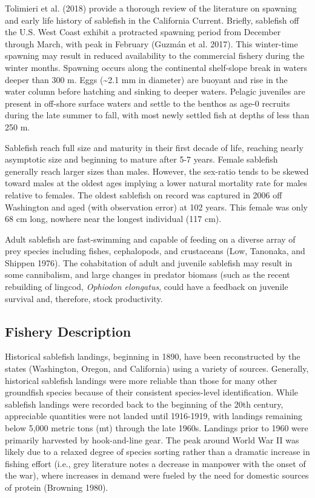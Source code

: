 \documentclass[
]{scrartcl}
\begin{document}
Tolimieri et al. (2018) provide a thorough review of the literature on
spawning and early life history of sablefish in the California Current.
Briefly, sablefish off the U.S. West Coast exhibit a protracted spawning
period from December through March, with peak in February (Guzmán et al.
2017). This winter-time spawning may result in reduced availability to
the commercial fishery during the winter months. Spawning occurs along
the continental shelf-slope break in waters deeper than 300 m. Eggs
(\textasciitilde2.1 mm in diameter) are buoyant and rise in the water
column before hatching and sinking to deeper waters. Pelagic juveniles
are present in off-shore surface waters and settle to the benthos as
age-0 recruits during the late summer to fall, with most newly settled
fish at depths of less than 250 m.

Sablefish reach full size and maturity in their first decade of life,
reaching nearly asymptotic size and beginning to mature after 5-7 years.
Female sablefish generally reach larger sizes than males. However, the
sex-ratio tends to be skewed toward males at the oldest ages implying a
lower natural mortality rate for males relative to females. The oldest
sablefish on record was captured in 2006 off Washington and aged (with
observation error) at 102 years. This female was only 68 cm long,
nowhere near the longest individual (117 cm).

Adult sablefish are fast-swimming and capable of feeding on a diverse
array of prey species including fishes, cephalopods, and crustaceans
(Low, Tanonaka, and Shippen 1976). The cohabitation of adult and
juvenile sablefish may result in some cannibalism, and large changes in
predator biomass (such as the recent rebuilding of lingcod,
\emph{Ophiodon elongatus}, could have a feedback on juvenile survival
and, therefore, stock productivity.

\subsection{Fishery Description}\label{fishery-description}

Historical sablefish landings, beginning in 1890, have been
reconstructed by the states (Washington, Oregon, and California) using a
variety of sources. Generally, historical sablefish landings were more
reliable than those for many other groundfish species because of their
consistent species-level identification. While sablefish landings were
recorded back to the beginning of the 20th century, appreciable
quantities were not landed until 1916-1919, with landings remaining
below 5,000 metric tons (mt) through the late 1960s. Landings prior to
1960 were primarily harvested by hook-and-line gear. The peak around
World War II was likely due to a relaxed degree of species sorting
rather than a dramatic increase in fishing effort (i.e., grey literature
notes a decrease in manpower with the onset of the war), where increases
in demand were fueled by the need for domestic sources of protein
(Browning 1980).
\end{document}
